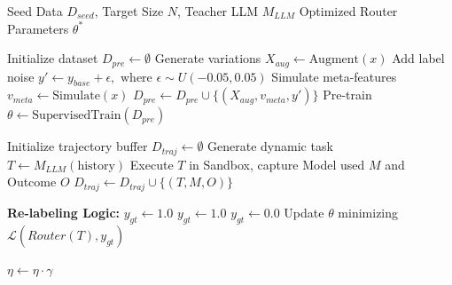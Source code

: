 \documentclass{article}
\theoremstyle{plain}
\theoremstyle{definition}
\theoremstyle{remark}
\begin{document}
\begin{center}
\begin{minipage}{0.98\linewidth}
\begin{algorithm}[H]
  \caption{Three-Stage Hybrid Training Strategy}
  \label{alg:hybrid_training}
  \begin{algorithmic}[1]
     Seed Data $D_{seed}$, Target Size $N$, Teacher LLM $M_{LLM}$
     Optimized Router Parameters $\theta^*$
    
    \STATE {}
    \STATE Initialize dataset $D_{pre} \leftarrow \emptyset$
        \STATE Generate variations $X_{aug} \leftarrow \text{Augment}(x)$
        \STATE Add label noise $y' \leftarrow y_{base} + \epsilon, \text{ where } \epsilon \sim U(-0.05, 0.05)$
        \STATE Simulate meta-features $v_{meta} \leftarrow \text{Simulate}(x)$
        \STATE $D_{pre} \leftarrow D_{pre} \cup \{(X_{aug}, v_{meta}, y')\}$
    \ENDFOR
    \STATE Pre-train $\theta \leftarrow \text{SupervisedTrain}(D_{pre})$
    
    \STATE {}
    \STATE Initialize trajectory buffer $D_{traj} \leftarrow \emptyset$
        \STATE Generate dynamic task $T \leftarrow M_{LLM}(\text{history})$
        \STATE Execute $T$ in Sandbox, capture Model used $M$ and Outcome $O$
        \STATE $D_{traj} \leftarrow D_{traj} \cup \{(T, M, O)\}$
    \ENDWHILE
    
    \STATE {}
            \STATE \textbf{Re-labeling Logic:}
                \STATE $y_{gt} \leftarrow 1.0$ 
                    \STATE $y_{gt} \leftarrow 1.0$
                \ELSE
                    \STATE $y_{gt} \leftarrow 0.0$
                \ENDIF
            \ENDIF
            \STATE Update $\theta$ minimizing $\mathcal{L}(Router(T), y_{gt})$
        \ENDFOR
        
        \STATE {}
            \STATE $\eta \leftarrow \eta \cdot \gamma$ 
        \ENDIF
    \ENDFOR
    

\end{algorithmic}
\end{algorithm}
\end{minipage}
\end{center}
\end{document}
